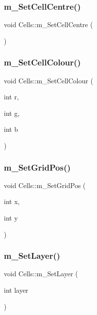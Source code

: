 \subsubsection{\texorpdfstring{m\+\_\+\+Set\+Cell\+Centre()}{m\_SetCellCentre()}}
{\footnotesize\ttfamily void Cells\+::m\+\_\+\+Set\+Cell\+Centre (\begin{DoxyParamCaption}{ }\end{DoxyParamCaption})}

\mbox{\label{class_cells_a54a485e9bed0760a0a7464311b59a700}} 
\subsubsection{\texorpdfstring{m\+\_\+\+Set\+Cell\+Colour()}{m\_SetCellColour()}}
{\footnotesize\ttfamily void Cells\+::m\+\_\+\+Set\+Cell\+Colour (\begin{DoxyParamCaption}\item[{int}]{r,  }\item[{int}]{g,  }\item[{int}]{b }\end{DoxyParamCaption})}

\mbox{\label{class_cells_ace2656aa881803e17d7d53c9031e6ee4}} 
\subsubsection{\texorpdfstring{m\+\_\+\+Set\+Grid\+Pos()}{m\_SetGridPos()}}
{\footnotesize\ttfamily void Cells\+::m\+\_\+\+Set\+Grid\+Pos (\begin{DoxyParamCaption}\item[{int}]{x,  }\item[{int}]{y }\end{DoxyParamCaption})}

\mbox{\label{class_cells_a4978491aa8ad58dd1c1f2ad0431d78b6}} 
\subsubsection{\texorpdfstring{m\+\_\+\+Set\+Layer()}{m\_SetLayer()}}
{\footnotesize\ttfamily void Cells\+::m\+\_\+\+Set\+Layer (\begin{DoxyParamCaption}\item[{int}]{layer }\end{DoxyParamCaption})}

